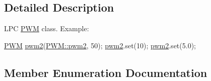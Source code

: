 \subsection{Detailed Description}
L\+PC \hyperlink{classPWM}{P\+WM} class. Example\+: 
\begin{DoxyCode}
\hyperlink{classPWM}{PWM} \hyperlink{classPWM_a4a7c14d2027c2cc508d4ff7abfe79ae7a6915379c35fd961109595bfc851e881c}{pwm2}(\hyperlink{classPWM_a4a7c14d2027c2cc508d4ff7abfe79ae7a6915379c35fd961109595bfc851e881c}{PWM::pwm2}, 50);
\hyperlink{classPWM_a4a7c14d2027c2cc508d4ff7abfe79ae7a6915379c35fd961109595bfc851e881c}{pwm2}.set(10);
\hyperlink{classPWM_a4a7c14d2027c2cc508d4ff7abfe79ae7a6915379c35fd961109595bfc851e881c}{pwm2}.set(5.0);
\end{DoxyCode}
 

\subsection{Member Enumeration Documentation}
